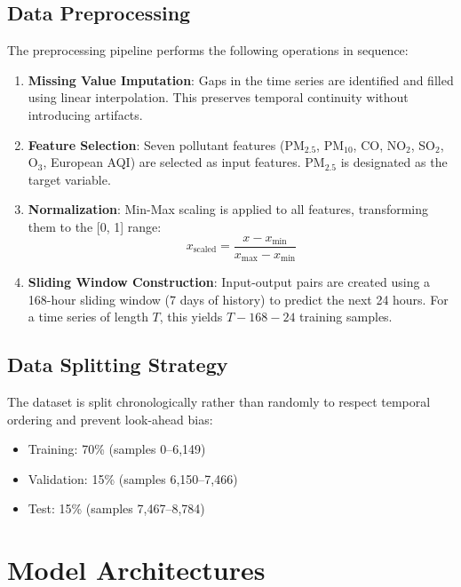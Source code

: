 \subsection{Data Preprocessing}

The preprocessing pipeline performs the following operations in sequence:

\begin{enumerate}
    \item \textbf{Missing Value Imputation}: Gaps in the time series are identified and filled using linear interpolation. This preserves temporal continuity without introducing artifacts.
    \item \textbf{Feature Selection}: Seven pollutant features (PM$_{2.5}$, PM$_{10}$, CO, NO$_2$, SO$_2$, O$_3$, European AQI) are selected as input features. PM$_{2.5}$ is designated as the target variable.
    \item \textbf{Normalization}: Min-Max scaling is applied to all features, transforming them to the [0, 1] range:
    \begin{equation}
        x_{\text{scaled}} = \frac{x - x_{\min}}{x_{\max} - x_{\min}}
    \end{equation}
    \item \textbf{Sliding Window Construction}: Input-output pairs are created using a 168-hour sliding window (7 days of history) to predict the next 24 hours. For a time series of length $T$, this yields $T - 168 - 24$ training samples.
\end{enumerate}

\subsection{Data Splitting Strategy}

The dataset is split chronologically rather than randomly to respect temporal ordering and prevent look-ahead bias:
\begin{itemize}
    \item Training: 70\% (samples 0--6,149)
    \item Validation: 15\% (samples 6,150--7,466)
    \item Test: 15\% (samples 7,467--8,784)
\end{itemize}

\section{Model Architectures}

